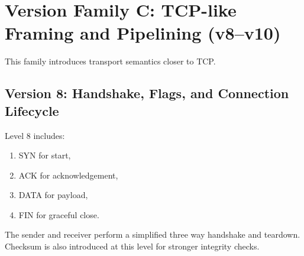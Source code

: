 \clearpage
\section{Version Family C: TCP-like Framing and Pipelining (v8--v10)}
This family introduces transport semantics closer to TCP.

\subsection{Version 8: Handshake, Flags, and Connection Lifecycle}
Level 8 includes:
\begin{enumerate}
    \item SYN for start,
    \item ACK for acknowledgement,
    \item DATA for payload,
    \item FIN for graceful close.
\end{enumerate}

The sender and receiver perform a simplified three way handshake and teardown.
Checksum is also introduced at this level for stronger integrity checks.

